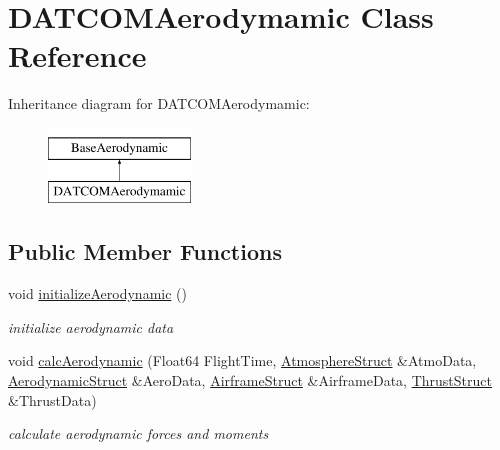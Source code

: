 \hypertarget{class_d_a_t_c_o_m_aerodymamic}{}\section{D\+A\+T\+C\+O\+M\+Aerodymamic Class Reference}
\label{class_d_a_t_c_o_m_aerodymamic}
Inheritance diagram for D\+A\+T\+C\+O\+M\+Aerodymamic\+:\begin{figure}[H]
\begin{center}
\leavevmode
\includegraphics[height=2.000000cm]{class_d_a_t_c_o_m_aerodymamic}
\end{center}
\end{figure}
\subsection*{Public Member Functions}
\begin{DoxyCompactItemize}
\item 
\mbox{\label{class_d_a_t_c_o_m_aerodymamic_ad3c279c14de819e19e443568d7d46aff}} 
void \hyperlink{class_d_a_t_c_o_m_aerodymamic_ad3c279c14de819e19e443568d7d46aff}{initialize\+Aerodynamic} ()
\begin{DoxyCompactList}\small\item\em initialize aerodynamic data \end{DoxyCompactList}\item 
\mbox{\label{class_d_a_t_c_o_m_aerodymamic_a2c31940a25ec9396657d701ef3004327}} 
void \hyperlink{class_d_a_t_c_o_m_aerodymamic_a2c31940a25ec9396657d701ef3004327}{calc\+Aerodynamic} (Float64 Flight\+Time, \hyperlink{group___data_cloud_struct_atmosphere_struct}{Atmosphere\+Struct} \&Atmo\+Data, \hyperlink{group___data_cloud_struct_aerodynamic_struct}{Aerodynamic\+Struct} \&Aero\+Data, \hyperlink{group___data_cloud_struct_airframe_struct}{Airframe\+Struct} \&Airframe\+Data, \hyperlink{group___data_cloud_struct_thrust_struct}{Thrust\+Struct} \&Thrust\+Data)
\begin{DoxyCompactList}\small\item\em calculate aerodynamic forces and moments \end{DoxyCompactList}\end{DoxyCompactItemize}


